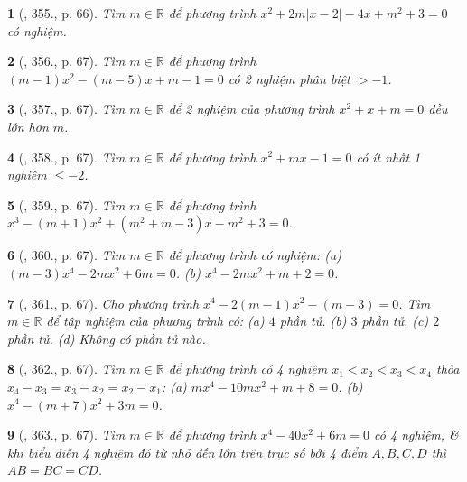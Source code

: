 \documentclass{article}
\newtheorem{baitoan}{}
\begin{document}
\begin{baitoan}[\cite{Binh_Toan_9_tap_2}, 355., p. 66]
	Tìm $m\in\mathbb{R}$ để phương trình $x^2 + 2m|x - 2| - 4x + m^2 + 3 = 0$ có nghiệm.
\end{baitoan}

\begin{baitoan}[\cite{Binh_Toan_9_tap_2}, 356., p. 67]
	Tìm $m\in\mathbb{R}$ để phương trình $(m - 1)x^2 - (m - 5)x + m - 1 = 0$ có 2 nghiệm phân biệt $> -1$.
\end{baitoan}

\begin{baitoan}[\cite{Binh_Toan_9_tap_2}, 357., p. 67]
	Tìm $m\in\mathbb{R}$ để 2 nghiệm của phương trình $x^2 + x + m = 0$ đều lớn hơn $m$.
\end{baitoan}

\begin{baitoan}[\cite{Binh_Toan_9_tap_2}, 358., p. 67]
	Tìm $m\in\mathbb{R}$ để phương trình $x^2 + mx - 1 = 0$ có ít nhất 1 nghiệm $\le-2$.
\end{baitoan}

\begin{baitoan}[\cite{Binh_Toan_9_tap_2}, 359., p. 67]
	Tìm $m\in\mathbb{R}$ để phương trình $x^3 - (m + 1)x^2 + (m^2 + m - 3)x - m^2 + 3 = 0$.
\end{baitoan}

\begin{baitoan}[\cite{Binh_Toan_9_tap_2}, 360., p. 67]
	Tìm $m\in\mathbb{R}$ để phương trình có nghiệm: (a) $(m - 3)x^4 - 2mx^2 + 6m = 0$. (b) $x^4 - 2mx^2 + m + 2 = 0$.
\end{baitoan}

\begin{baitoan}[\cite{Binh_Toan_9_tap_2}, 361., p. 67]
	Cho phương trình $x^4 - 2(m - 1)x^2 - (m - 3) = 0$. Tìm $m\in\mathbb{R}$ để tập nghiệm của phương trình có: (a) $4$ phần tử. (b) $3$ phần tử. (c) $2$ phần tử. (d) Không có phần tử nào.
\end{baitoan}

\begin{baitoan}[\cite{Binh_Toan_9_tap_2}, 362., p. 67]
	Tìm $m\in\mathbb{R}$ để phương trình có 4 nghiệm $x_1 < x_2 < x_3 < x_4$ thỏa $x_4 - x_3 = x_3 - x_2 = x_2 - x_1$: (a) $mx^4 - 10mx^2 + m + 8 = 0$. (b) $x^4 - (m + 7)x^2 + 3m = 0$.
\end{baitoan}

\begin{baitoan}[\cite{Binh_Toan_9_tap_2}, 363., p. 67]
	Tìm $m\in\mathbb{R}$ để phương trình $x^4 - 40x^2 + 6m = 0$ có 4 nghiệm, \& khi biểu diễn 4 nghiệm đó từ nhỏ đến lớn trên trục số bởi 4 điểm $A,B,C,D$ thì $AB = BC = CD$.
\end{baitoan}
\end{document}
